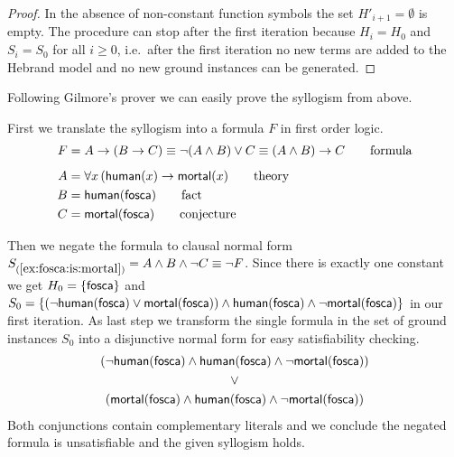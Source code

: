 \begin{proof}
	In the absence of non-constant function symbols the set \(H'_{i+1} = \emptyset\) is empty.
	The procedure can stop after the first iteration because
	\(H_i = H_0\) and \(S_i = S_0\) for all \(i\geq0\),
	i.e.~after the first iteration
	no new terms are added to the Hebrand model
	and no new ground instances can be generated.
\end{proof}

Following Gilmore's prover we can easily prove the syllogism from above.

\begin{example}\label{ex:fosca:is:mortal}
	First we translate the syllogism into a formula \(F\) in first order logic.
	\begin{align*}
	F &= A \rightarrow (B \rightarrow C) \equiv \lnot(A\land B) \lor C \equiv (A\land B)\rightarrow C
	\tag*{formula}
	\\[0.5em]
	A &= \forall x\, ( \mathsf{human}(x) \rightarrow \mathsf{mortal}(x)
	\tag*{theory}
	\\
	B &= \mathsf{human}(\mathsf{fosca})
	\tag*{fact}
	\\
	C &= \mathsf{mortal}(\mathsf{fosca})
	\tag*{conjecture}
	\end{align*}



	Then we negate the formula to clausal normal form \(S_{(\ref{ex:fosca:is:mortal})} = A\land B \land\lnot C \equiv \lnot F\).
	Since there is exactly one constant we get
	\(H_0 = \{ \mathsf{fosca} \}\) and
	$S_0 =
	\{
	(\lnot\mathsf{human}(\mathsf{fosca})\lor\mathsf{mortal}(\mathsf{fosca}))\land\mathsf{human}(\mathsf{fosca})\land\lnot\mathsf{mortal}(\mathsf{fosca})
	\}$ in our first iteration.
	As last step we transform the single formula in
	the set of ground instances \(S_0\) into a disjunctive normal form
	for easy satisfiability checking.
	\begin{gather*}
	(\lnot\mathsf{human}(\mathsf{fosca})\land\mathsf{human}(\mathsf{fosca})\land\lnot\mathsf{mortal}(\mathsf{fosca}))
	\\
	\lor
	\\
	(\mathsf{mortal}(\mathsf{fosca})\land\mathsf{human}(\mathsf{fosca})\land\lnot\mathsf{mortal}(\mathsf{fosca}))
	\end{gather*}
	Both conjunctions contain complementary literals and we conclude the negated formula is unsatisfiable
	and the given syllogism holds.

\end{example}

